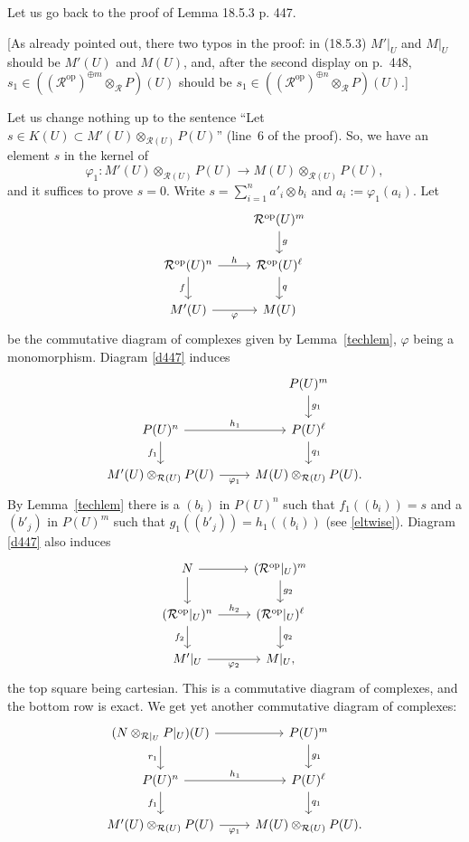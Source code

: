 \documentclass[12pt]{article}
\theoremstyle{remark}
\theoremstyle{definition}
\newcommand{\cc}{\mathcal}
\DeclareMathOperator{\op}{op}
\begin{document}
Let us go back to the proof of Lemma 18.5.3 p. 447.

[As already pointed out, there two typos in the proof: in (18.5.3) $M'|_U$ and $M|_U$ should be $M'(U)$ and $M(U)$, and, after the second display on p.~448, $s_1\in((\cc R^{\op})^{\oplus m}\otimes_{\cc R}P)(U)$ should be $s_1\in((\cc R^{\op})^{\oplus n}\otimes_{\cc R}P)(U)$.]

Let us change nothing up to the sentence ``Let $s\in K(U)\subset M'(U)\otimes_{\cc R(U)}P(U)$'' (line~6 of the proof). So, we have an element $s$ in the kernel of 
$$
\varphi_1:M'(U)\otimes_{\cc R(U)}P(U)\to M(U)\otimes_{\cc R(U)}P(U),
$$ 
and it suffices to prove $s=0$. Write $s=\sum_{i=1}^na'_i\otimes b_i$ and $a_i:=\varphi_1(a_i)$. Let
%
\begin{equation}\label{d447}
\begin{tikzcd}
{}&\cc R^{\op}(U)^m\ar{d}{g}\\ 
\cc R^{\op}(U)^n\ar{r}{h}\ar{d}[swap]{f}&\cc R^{\op}(U)^\ell\ar{d}{q}\\ 
M'(U)\ar{r}[swap]{\varphi}&M(U)
\end{tikzcd}
\end{equation}
%
be the commutative diagram of complexes given by Lemma~\ref{techlem}, $\varphi$ being a monomorphism. Diagram \eqref{d447} induces
$$
\begin{tikzcd}
{}&P(U)^m\ar{d}{g_1}\\ 
P(U)^n\ar{r}{h_1}\ar{d}[swap]{f_1}&P(U)^\ell\ar{d}{q_1}\\ 
M'(U)\otimes_{\cc R(U)}P(U)\ar{r}[swap]{\varphi_1}&M(U)\otimes_{\cc R(U)}P(U).
\end{tikzcd}
$$ 
By Lemma~\ref{techlem} there is a $(b_i)$ in $P(U)^n$ such that $f_1((b_i))=s$ and a $(b'_j)$ in $P(U)^m$ such that $g_1((b'_j))=h_1((b_i))$ (see \eqref{eltwise}). Diagram \eqref{d447} also induces
$$
\begin{tikzcd}
N\ar{r}\ar{d}&(\cc R^{\op}|_U)^m\ar{d}{g_2}\\ 
(\cc R^{\op}|_U)^n\ar{r}{h_2}\ar{d}[swap]{f_2}&(\cc R^{\op}|_U)^\ell\ar{d}{q_2}\\ 
M'|_U\ar{r}[swap]{\varphi_2}&M|_U,
\end{tikzcd}
$$ 
the top square being cartesian. This is a commutative diagram of complexes, and the bottom row is exact. We get yet another commutative diagram of complexes:
$$
\begin{tikzcd}
(N\otimes_{\cc R|_U}P|_U)(U)\ar{r}\ar{d}[swap]{r_1}&P(U)^m\ar{d}{g_1}\\ 
P(U)^n\ar{r}{h_1}\ar{d}[swap]{f_1}&P(U)^\ell\ar{d}{q_1}\\ 
M'(U)\otimes_{\cc R(U)}P(U)\ar{r}[swap]{\varphi_1}&M(U)\otimes_{\cc R(U)}P(U).
\end{tikzcd}
$$ 
\end{document}
